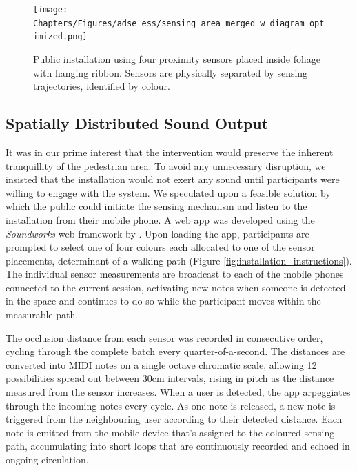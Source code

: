 \begin{figure}[!h]
\centering
\texttt{[image: Chapters/Figures/adse\_ess/sensing\_area\_merged\_w\_diagram\_optimized.png]}
{
\caption[Public installation using four proximity sensors]{Public installation using four proximity sensors placed inside foliage with hanging ribbon. Sensors are physically separated by sensing trajectories, identified by colour.
}
\label{fig:installation_sensor_setup}
}
\vspace*{-20pt}
\end{figure}

\subsection{Spatially Distributed Sound Output}

It was in our prime interest that the intervention would preserve the inherent tranquillity of the pedestrian area. To avoid any unnecessary disruption, we insisted that the installation would not exert any sound until participants were willing to engage with the system. We speculated upon a feasible solution by which the public could initiate the sensing mechanism and listen to the installation from their mobile phone. A web app was developed using the \textit{Soundworks} web framework by \citeauthor{matuszewski_interaction_2019}. Upon loading the app, participants are prompted to select one of four colours each allocated to one of the sensor placements, determinant of a walking path (Figure \ref{fig:installation_instructions}). The individual sensor measurements are broadcast to each of the mobile phones connected to the current session, activating new notes when someone is detected in the space and continues to do so while the participant moves within the measurable path.

The occlusion distance from each sensor was recorded in consecutive order, cycling through the complete batch every quarter-of-a-second. The distances are converted into MIDI notes on a single octave chromatic scale, allowing 12 possibilities spread out between 30cm intervals, rising in pitch as the distance measured from the sensor increases. When a user is detected, the app arpeggiates through the incoming notes every cycle. As one note is released, a new note is triggered from the neighbouring user according to their detected distance. Each note is emitted from the mobile device that's assigned to the coloured sensing path, accumulating into short loops that are continuously recorded and echoed in ongoing circulation.

